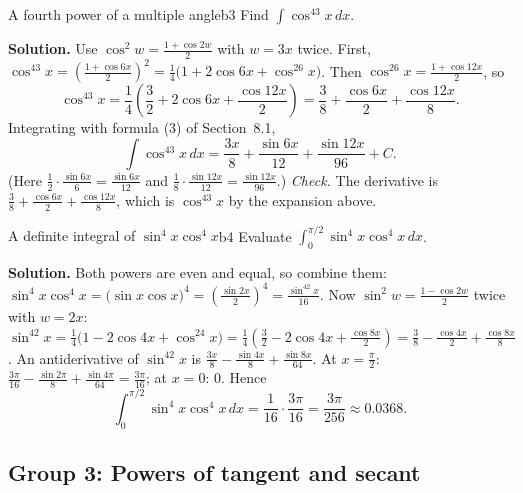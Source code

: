 \documentclass[11pt]{article}
\begin{document}
\begin{exmp}{A fourth power of a multiple angle}{b3}
Find $\int\cos^43x\,dx$.

\textbf{Solution.} Use $\cos^2w=\frac{1+\cos2w}2$ with $w=3x$ twice. First, $\cos^43x=\left(\frac{1+\cos6x}2\right)^2=\frac14\big(1+2\cos6x+\cos^26x\big)$. Then $\cos^26x=\frac{1+\cos12x}2$, so
\[\cos^43x=\frac14\left(\frac32+2\cos6x+\frac{\cos12x}2\right)=\frac38+\frac{\cos6x}2+\frac{\cos12x}8 .\]
Integrating with formula (3) of Section~8.1,
\[\int\cos^43x\,dx=\frac{3x}8+\frac{\sin6x}{12}+\frac{\sin12x}{96}+C .\]
(Here $\frac12\cdot\frac{\sin6x}6=\frac{\sin6x}{12}$ and $\frac18\cdot\frac{\sin12x}{12}=\frac{\sin12x}{96}$.) \emph{Check.} The derivative is $\frac38+\frac{\cos6x}2+\frac{\cos12x}8$, which is $\cos^43x$ by the expansion above.
\end{exmp}

\begin{exmp}{A definite integral of $\sin^4x\cos^4x$}{b4}
Evaluate $\displaystyle\int_0^{\pi/2}\sin^4x\cos^4x\,dx$.

\textbf{Solution.} Both powers are even and equal, so combine them: $\sin^4x\cos^4x=\big(\sin x\cos x\big)^4=\left(\frac{\sin2x}2\right)^4=\frac{\sin^42x}{16}$. Now $\sin^2w=\frac{1-\cos2w}2$ twice with $w=2x$: $\sin^42x=\frac14\big(1-2\cos4x+\cos^24x\big)=\frac14\left(\frac32-2\cos4x+\frac{\cos8x}2\right)=\frac38-\frac{\cos4x}2+\frac{\cos8x}8$. An antiderivative of $\sin^42x$ is $\frac{3x}8-\frac{\sin4x}8+\frac{\sin8x}{64}$. At $x=\frac\pi2$: $\frac{3\pi}{16}-\frac{\sin2\pi}8+\frac{\sin4\pi}{64}=\frac{3\pi}{16}$; at $x=0$: $0$. Hence
\[\int_0^{\pi/2}\sin^4x\cos^4x\,dx=\frac1{16}\cdot\frac{3\pi}{16}=\frac{3\pi}{256}\approx0.0368 .\]
\end{exmp}

\subsection*{Group 3: Powers of tangent and secant}
\end{document}

